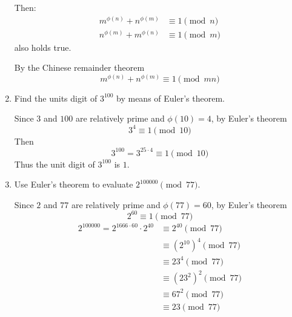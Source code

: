 \documentclass[12pt]{exam}
\theoremstyle{definition}
\begin{document}
\begin{enumerate}
\begin{answer}
                  Then:
                  \[
                        \begin{aligned}
                              m^{\phi(n)} + n^{\phi(m)} & \equiv 1 \pmod n \\
                              n^{\phi(m)} + m^{\phi(n)} & \equiv 1 \pmod m
                        \end{aligned}
                  \]
                  also holds true.

                  By the Chinese remainder theorem
                  \[
                        m^{\phi(n)} + n^{\phi(m)} \equiv 1 \pmod {mn}
                  \]
            \end{answer}

            \setcounter{enumi}{6}
      \item Find the units digit of $3^{100}$ by means of Euler's theorem.

            \begin{answer}
                  Since $3$ and $100$ are relatively prime and $\phi(10) = 4$, by Euler's theorem
                  \[
                        3^4 \equiv 1 \pmod{10}
                  \]
                  Then
                  \[
                        3^{100} = 3^{25 \cdot 4} \equiv 1 \pmod{10}
                  \]
                  Thus the unit digit of $3^{100}$ is $1$.
            \end{answer}

            \setcounter{enumi}{8}
      \item Use Euler's theorem to evaluate $2^{100000} \pmod{77}$.

            \begin{answer}
                  Since $2$ and $77$ are relatively prime and $\phi(77) = 60$, by Euler's theorem
                  \[
                        2^{60} \equiv 1 \pmod{77}
                  \]
                  \[
                        \begin{aligned}
                              2^{100000} = 2^{1666\cdot60}\cdot2^{40} & \equiv 2^{40} \pmod{77}       \\
                                                                      & \equiv {(2^{10})}^4 \pmod{77} \\
                                                                      & \equiv 23^4 \pmod{77}         \\
                                                                      & \equiv {(23^2)}^2 \pmod{77}   \\
                                                                      & \equiv 67^2 \pmod{77}         \\
                                                                      & \equiv 23 \pmod{77}           \\
                        \end{aligned}
                  \]
            \end{answer}


\end{enumerate}
\end{document}
